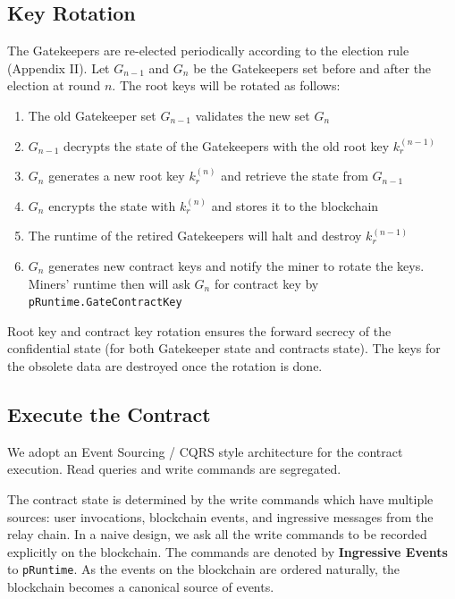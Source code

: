 \subsection{Key Rotation}

The Gatekeepers are re-elected periodically according to the election rule (Appendix II). Let $G_{n-1}$ and $G_n$ be the Gatekeepers set before and after the election at round $n$. The root keys will be rotated as follows:

\begin{enumerate}
    \item The old Gatekeeper set $G_{n-1}$ validates the new set $G_n$
    \item $G_{n-1}$ decrypts the state of the Gatekeepers with the old root key $k_r^{(n-1)}$
    \item $G_n$ generates a new root key $k_r^{(n)}$ and retrieve the state from $G_{n-1}$
    \item $G_n$ encrypts the state with $k_r^{(n)}$ and stores it to the blockchain
    \item The runtime of the retired Gatekeepers will halt and destroy $k_r^{(n-1)}$
    \item $G_n$ generates new contract keys and notify the miner to rotate the keys. Miners' runtime then will ask $G_n$ for contract key by \texttt{pRuntime.GateContractKey}
\end{enumerate}

Root key and contract key rotation ensures the forward secrecy of the confidential state (for both Gatekeeper state and contracts state). The keys for the obsolete data are destroyed once the rotation is done.

\subsection{Execute the Contract}

We adopt an Event Sourcing / CQRS style architecture for the contract execution. Read queries and write commands are segregated.

The contract state is determined by the write commands which have multiple sources: user invocations, blockchain events, and ingressive messages from the relay chain. In a naive design, we ask all the write commands to be recorded explicitly on the blockchain. The commands are denoted by \textbf{Ingressive Events} to \texttt{pRuntime}. As the events on the blockchain are ordered naturally, the blockchain becomes a canonical source of events.


